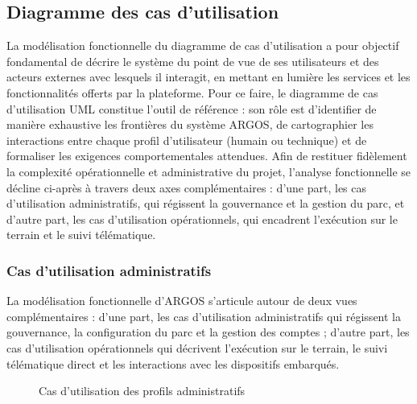 \subsection{Diagramme des cas d'utilisation}
\par La modélisation fonctionnelle du diagramme de cas d'utilisation a pour objectif fondamental de décrire le système du point de vue de ses utilisateurs et des acteurs externes avec lesquels il interagit, en mettant en lumière les services et les fonctionnalités offerts par la plateforme. Pour ce faire, le diagramme de cas d'utilisation UML constitue l'outil de référence : son rôle est d'identifier de manière exhaustive les frontières du système ARGOS, de cartographier les interactions entre chaque profil d'utilisateur (humain ou technique) et de formaliser les exigences comportementales attendues. Afin de restituer fidèlement la complexité opérationnelle et administrative du projet, l'analyse fonctionnelle se décline ci-après à travers deux axes complémentaires : d'une part, les cas d'utilisation administratifs, qui régissent la gouvernance et la gestion du parc, et d'autre part, les cas d'utilisation opérationnels, qui encadrent l'exécution sur le terrain et le suivi télématique.

\subsubsection{Cas d'utilisation administratifs}

La modélisation fonctionnelle d'ARGOS s'articule autour de deux vues complémentaires : d'une part, 
les cas d'utilisation administratifs qui régissent la gouvernance, la configuration du parc et la gestion des comptes ; 
d'autre part, les cas d'utilisation opérationnels qui décrivent l'exécution sur le terrain, 
le suivi télématique direct et les interactions avec les dispositifs embarqués.

\begin{figure}[htbp]
\centering
\begin{minipage}{\textwidth}
\centering
\resizebox{0.82\textwidth}{!}{%
}
\caption{Cas d'utilisation des profils administratifs}
\label{fig-argos-usecase-admin}
\end{minipage}
\tablesourcepromoteurs

\end{figure}

